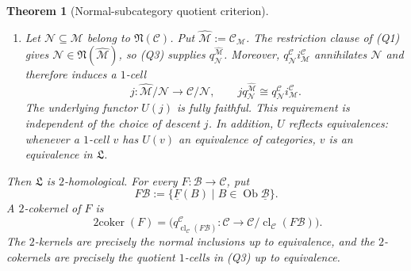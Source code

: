 \documentclass[11pt,reqno,a4paper]{amsart}
\newtheorem{theorem}{Theorem}[section]
\theoremstyle{definition}
\theoremstyle{remark}
\newcommand{\C}{\mathcal{C}}
\newcommand{\M}{\mathcal{M}}
\newcommand{\N}{\mathcal{N}}
\newcommand{\0}{\mathbf{0}}
\renewcommand{\1}{\mathbf{1}}
\newcommand{\iso}{\cong}
\newcommand{\Lcat}{\mathfrak L}
\newcommand{\B}{\mathcal B}
\newcommand{\twocoker}{\operatorname{2coker}}
\DeclareMathOperator{\cl}{cl}
\begin{document}
\begin{theorem}[Normal-subcategory quotient criterion]
\begin{enumerate}[label=\textup{(Q\arabic*)},leftmargin=16mm]
\item Let $\N\subseteq\M$ belong to $\mathfrak{N}(\C)$.
Put $\widehat{\M}:=\C_{\M}$. The restriction clause of
(Q1) gives $\N\in\mathfrak{N}(\widehat{\M})$, so (Q3)
supplies $q_{\N}^{\widehat{\M}}$. Moreover,
$q_{\N}^{\C}i_{\M}^{\C}$ annihilates $\N$ and therefore
induces a $1$-cell
\[
 j:\widehat{\M}/\N\longrightarrow\C/\N,
 \qquad
 j q_{\N}^{\widehat{\M}}
 \iso q_{\N}^{\C}i_{\M}^{\C}.
\]
The underlying functor $U(j)$ is fully faithful.
This requirement is independent of the choice of descent $j$.
In addition, $U$ reflects equivalences: whenever a $1$-cell
$v$ has $U(v)$ an equivalence of categories, $v$ is an
equivalence in $\Lcat$.
\end{enumerate}
Then $\Lcat$ is $2$-homological. For every $F:\B\to\C$, put
\[
 F\B:=\{\underline{F}(B)\mid B\in\operatorname{Ob}\underline{\B}\}.
\]
A $2$-cokernel of $F$ is
\begin{equation}\label{eq:generalcoker}
 \twocoker(F)=
 \bigl(q_{\cl_{\C}(F\B)}^{\C}:\C\longrightarrow
       \C/\cl_{\C}(F\B)\bigr).
\end{equation}
The $2$-kernels are precisely the normal inclusions up to
equivalence, and the $2$-cokernels are precisely the quotient
$1$-cells in \textup{(Q3)} up to equivalence.
\end{theorem}
\end{document}
